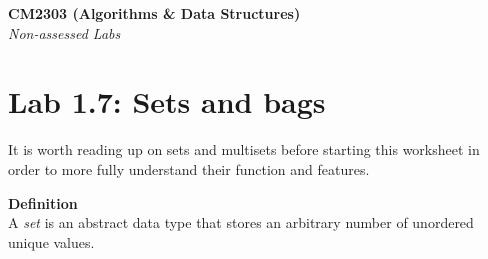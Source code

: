 \documentclass[11pt,a4paper]{report}
\begin{document}
\noindent\Large\textbf{CM2303 (Algorithms \& Data Structures)}\\
\noindent\large\textit{Non-assessed Labs}
\vskip30pt

\section*{Lab 1.7: Sets and bags}

It is worth reading up on sets and multisets before starting this worksheet in order to more fully understand their function and features.

\vskip20pt

\noindent \textbf{Definition}\\
A \textit{set} is an abstract data type that stores an arbitrary number of unordered unique values.

\vskip20pt
\end{document}
